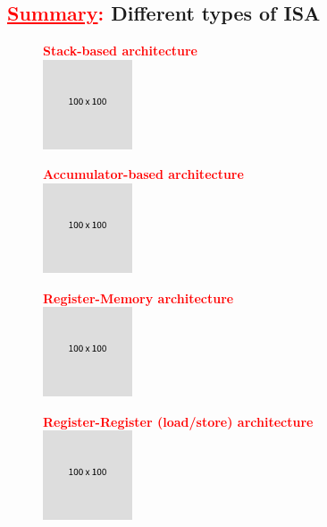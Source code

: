 \documentclass[
  14pt,
  a4paper,
  DIV=11,
  numbers=noendperiod,
  headinclude=true,
  footinclude=true]{scrreprt}
\begin{document}
\newpage{}

\subsection{\texorpdfstring{\textcolor{red}{\underline{Summary}:}
Different types of
ISA}{: Different types of ISA}}\label{different-types-of-isa}

\begin{figure}

\begin{minipage}{0.50\linewidth}
\textcolor{red}{\textbf{Stack-based architecture}}\\
\includegraphics{index_files/mediabag/FiKGhYhhIWJYiBgWIoaF.png}\end{minipage}%
%
\begin{minipage}{0.50\linewidth}
\textcolor{red}{\textbf{Accumulator-based architecture}}\\
\includegraphics{index_files/mediabag/FiKGhYhhIWJYiBgWIoaF.png}\end{minipage}%
\newline
\begin{minipage}{0.50\linewidth}
\textcolor{red}{\textbf{Register-Memory architecture}}\\
\includegraphics{index_files/mediabag/FiKGhYhhIWJYiBgWIoaF.png}\end{minipage}%
%
\begin{minipage}{0.50\linewidth}
\textcolor{red}{\textbf{Register-Register (load/store) architecture}}\\
\includegraphics{index_files/mediabag/FiKGhYhhIWJYiBgWIoaF.png}\end{minipage}%

\end{figure}%
\end{document}
